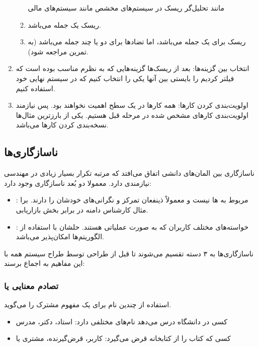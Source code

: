 \begin{enumerate}
\begin{enumerate}
        مانند تحلیل‌گر ریسک در سیستم‌های مخشص مانند سیستم‌های مالی
        \item ریسک  یک جمله می‌باشد.
        \item ریسک برای یک جمله می‌باشد، اما تضاد‌ها برای دو یا چند جمله می‌باشد
        (به تمرین  مراجعه شود).
    \end{enumerate}
    \item انتخاب بین گزینه‌ها: بعد از ریسک‌ها گزینه‌هایی که به نظرم مناسب بوده
    است که فیلتر کردیم را بایستی بین آنها یکی را انتخاب کنیم که در سیستم نهایی
    خود استفاده کنیم.
    \item اولویت‌بندی کردن کار‌ها: همه کار‌ها در یک سطح اهمیت نخواهند بود. پس
    نیازمند اولویت‌بندی کار‌های مشخص شده در مرحله قبل هستیم. یکی از بارزترین
    مثال‌ها نسخه‌بندی کردن کار‌ها می‌باشد.
\end{enumerate}

\subsection{ناسازگاری‌ها}

ناسازگاری بین المان‌های دانشی اتفاق می‌افتد که مرتبه تکرار بسیار زیادی در مهندسی
نیازمندی دارد. معمولا دو بُعد ناسازگاری وجود دارد:

\begin{itemize}
    \item {}: مربوط به ها نیست و معمولاً ذینفعان تمرکز
    و نگرانی‌های خودشان را دارند. برا مثال کارشناس دامنه در برابر بخش بازاریابی.
    \item {}: خواسته‌های مختلف کاربران که به صورت عملیاتی
    هستند. حلشان با استفاده از الگوریتم‌ها امکان‌پذیر می‌باشد.
\end{itemize}

ناسازگاری‌ها به ۳ دسته تقسیم می‌شوند تا قبل از طراحی توسط طراح سیستم همه با این
مفاهیم به اجماع برسند:

\subsubsection{تصادم معنایی یا }

استفاده از چندین نام برای یک مفهوم مشترک را می‌گوید.

\begin{itemize}
    \item کسی در دانشگاه درس می‌دهد نام‌های مختلفی دارد: استاد، دکتر، مدرس
    \item کسی که کتاب را از کتابخانه قرض می‌گیرد: کاربر، قرض‌گیرنده، مشتری یا
\end{itemize}

